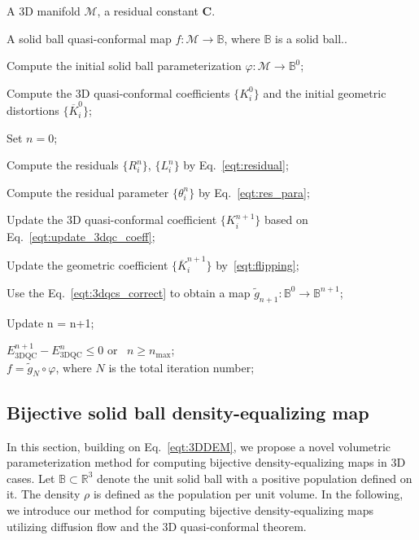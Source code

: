 \documentclass{article}
\begin{document}
\begin{algorithm}[h]
\caption{3D quasi-conformal map}
\label{alg:3DQC}
  \begin{algorithmic}[1]
    \Require A 3D manifold $\mathcal{M}$, a residual constant $\mathbf{C}$.

    \Ensure A solid ball quasi-conformal map $f:\mathcal{M}\to \mathbb{B}$, where $\mathbb B$ is a solid ball..

\State Compute the initial solid ball parameterization $\varphi: \mathcal{M} \rightarrow \mathbb B^0$;

\State Compute the 3D quasi-conformal coefficients $\{K^0_i \}$ and the initial geometric distortions $\{\overline{K}^0_i \}$;

\State Set $n = 0$;

\Repeat

\State Compute the residuals $\{R^n_i \}$, $\{L^n_i \}$  by Eq.~\eqref{eqt:residual};

\State Compute the residual parameter $\{\theta^n_i \} $ by Eq.~\eqref{eqt:res_para};

\State Update the 3D quasi-conformal coefficient $\{K^{n+1}_i \}$ based on Eq.~\eqref{eqt:update_3dqc_coeff};

\State Update the geometric coefficient $\{\overline{K}^{n+1}_i \}$ by~\eqref{eqt:flipping};

\State Use the Eq.~\eqref{eqt:3dqcs_correct} to obtain a map $\widetilde{g}_{n+1}: \mathbb B^0 \rightarrow \mathbb B^{n+1} $;

\State Update n = n+1;

\Until $E^{n+1}_{\text{3DQC}} - E^{n}_{\text{3DQC}} \leq 0$ or \ $n \geq n_{\max}$;\\

\Return $f = \widetilde{g}_N \circ \varphi$, where $N$ is the total iteration number;
 
  \end{algorithmic}
\end{algorithm}

\subsection{Bijective solid ball density-equalizing map}\label{sec:3ddem}
In this section, building on Eq.~\eqref{eqt:3DDEM}, we propose a novel volumetric parameterization method for computing bijective density-equalizing maps in 3D cases. Let $\mathbb{B} \subset \mathbb{R}^3$ denote the unit solid ball with a positive population defined on it. The density $\rho$ is defined as the population per unit volume. In the following, we introduce our method for computing bijective density-equalizing maps utilizing diffusion flow and the 3D quasi-conformal theorem.
\end{document}
